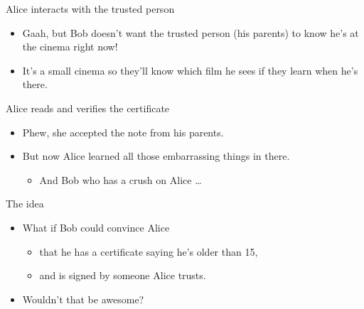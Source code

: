 \begin{frame}
  \begin{alertblock}{Alice interacts with the trusted person}
    \begin{itemize}
      \item Gaah, but Bob doesn't want the trusted person (his parents) to know 
        he's at the cinema right now!
      \item It's a small cinema so they'll know which film he sees if they 
        learn when he's there.
    \end{itemize}
  \end{alertblock}

  \pause{}

  \begin{alertblock}{Alice reads and verifies the certificate}
    \begin{itemize}
      \item Phew, she accepted the note from his parents.
      \item But now Alice learned all those embarrassing things in 
        there.
        \begin{itemize}
          \item And Bob who has a crush on Alice \dots
        \end{itemize}
    \end{itemize}
  \end{alertblock}
\end{frame}

\begin{frame}
  \begin{block}{The idea}
    \begin{itemize}
      \item What if Bob could convince Alice
        \begin{itemize}
          \item that he has a certificate saying he's older than 15,
          \item and is signed by someone Alice trusts.
        \end{itemize}
      \item Wouldn't that be awesome?
    \end{itemize}
  \end{block}
\end{frame}

